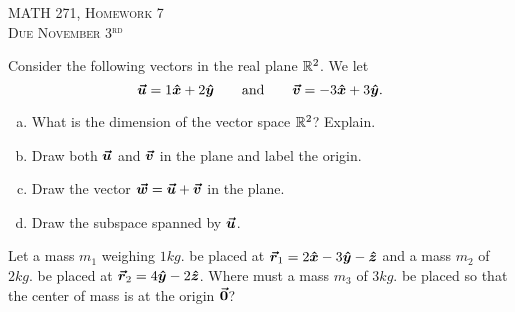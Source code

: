 \documentclass[12pt]{article} %
\begin{document}
\begin{center}
   \textsc{\large MATH 271, Homework 7}\\
   \textsc{Due November 3$^\textrm{rd}$}
\end{center}
\vspace{.5cm}

\begin{problem}
Consider the following vectors in the real plane $\mathbb{R}^2$. We let
\[
\boldsymbol{\vec{u}} = 1\boldsymbol{\hat{x}} + 2\boldsymbol{\hat{y}} \qquad \textrm{and} \qquad \boldsymbol{\vec{v}} = -3\boldsymbol{\hat{x}}+ 3\boldsymbol{\hat{y}}.
\]
\begin{enumerate}[(a)]
    \item What is the dimension of the vector space $\mathbb{R}^2$? Explain.
    \item Draw both $\boldsymbol{\vec{u}}$ and $\boldsymbol{\vec{v}}$ in the plane and label the origin.
    \item Draw the vector $\boldsymbol{\vec{w}} = \boldsymbol{\vec{u}}+\boldsymbol{\vec{v}}$ in the plane.
    \item Draw the subspace spanned by $\boldsymbol{\vec{u}}$.
\end{enumerate}
\end{problem}
\vspace*{0.5cm}

\begin{problem}
Let a mass $m_1$ weighing $1kg.$ be placed at $\boldsymbol{\vec{r}}_1=2\boldsymbol{\hat{x}} -3 \boldsymbol{\hat{y}} -\boldsymbol{\hat{z}}$ and a mass $m_2$ of $2kg.$ be placed at $\boldsymbol{\vec{r}}_2 = 4\boldsymbol{\hat{y}} -2\boldsymbol{\hat{z}}$.  Where must a mass $m_3$ of $3kg.$ be placed so that the center of mass is at the origin $\boldsymbol{\vec{0}}$?
\end{problem}
\vspace*{0.5cm}
\end{document}
